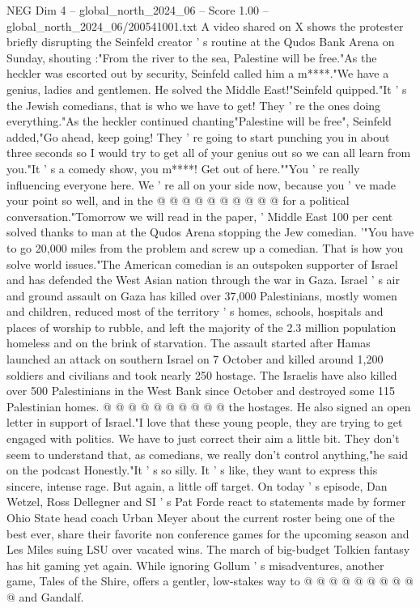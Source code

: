 \begin{textsample}{NEG Dim 4 – global\_north\_2024\_06 – Score 1.00 – global\_north\_2024\_06/200541001.txt}  \label{ex:f4_neg_329}
A video shared on X shows the protester briefly disrupting the Seinfeld creator ' s routine at the Qudos Bank Arena on Sunday, shouting :"From the river to the sea, Palestine will be free."As the heckler was escorted out by security, Seinfeld called him a m****."We have a genius, ladies and gentlemen.
He solved the Middle East!"Seinfeld quipped."It ' s the Jewish comedians, that is who we have to get!
They ' re the ones doing everything."As the heckler continued chanting"Palestine will be free", Seinfeld added,"Go ahead, keep going!
They ' re going to start punching you in about three seconds so I would try to get all of your genius out so we can all learn from you."It ' s a comedy show, you m****!
Get out of here.""You ' re really influencing everyone here.
We ' re all on your side now, because you ' ve made your point so well, and in the @ @ @ @ @ @ @ @ @ @ for a political conversation."Tomorrow we will read in the paper, ' Middle East 100 per cent solved thanks to man at the Qudos Arena stopping the Jew comedian. '"You have to go 20,000 miles from the problem and screw up a comedian.
That is how you solve world issues."The American comedian is an outspoken supporter of Israel and has defended the West Asian nation through the war in Gaza.
Israel ' s air and ground assault on Gaza has killed over 37,000 Palestinians, mostly women and children, reduced most of the territory ' s homes, schools, hospitals and places of worship to rubble, and left the majority of the 2.3 million population homeless and on the brink of starvation.
The assault started after Hamas launched an attack on southern Israel on 7 October and killed around 1,200 soldiers and civilians and took nearly 250 hostage.
The Israelis have also killed over 500 Palestinians in the West Bank since October and destroyed some 115 Palestinian homes. @ @ @ @ @ @ @ @ @ @ the hostages.
He also signed an open letter in support of Israel."I love that these young people, they are trying to get engaged with politics.
We have to just correct their aim a little bit.
They don't seem to understand that, as comedians, we really don't control anything,"he said on the podcast Honestly."It ' s so silly.
It ' s like, they want to express this sincere, intense rage.
But again, a little off target.
On today ' s episode, Dan Wetzel, Ross Dellegner and SI ' s Pat Forde react to statements made by former Ohio State head coach Urban Meyer about the current roster being one of the best ever, share their favorite non conference games for the upcoming season and Les Miles suing LSU over vacated wins.
The march of big-budget Tolkien fantasy has hit gaming yet again.
While ignoring Gollum ' s misadventures, another game, Tales of the Shire, offers a gentler, low-stakes way to @ @ @ @ @ @ @ @ @ @ and Gandalf.

\end{textsample}
